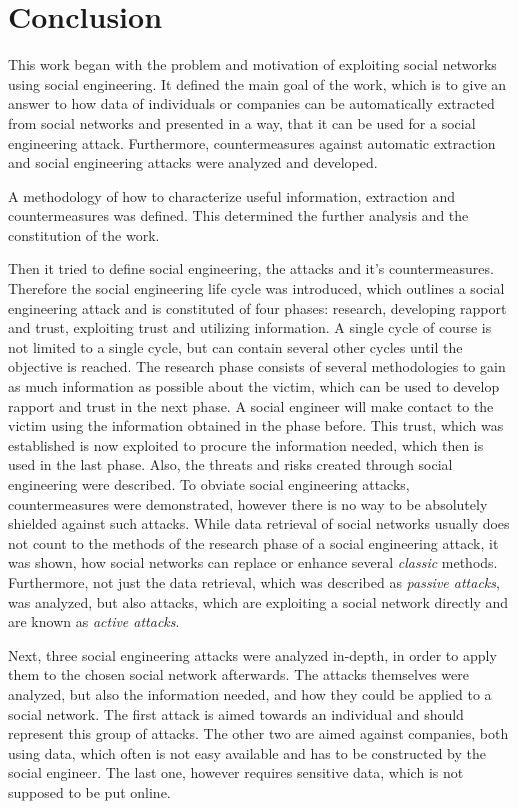 \chapter{Conclusion}
\label{chap:conclusion}

This work began with the problem and motivation of exploiting social networks
using social engineering. It defined the main goal of the work, which is to
give an answer to how data of individuals or companies can be automatically
extracted from social networks and presented in a way, that it can be used for
a social engineering attack. Furthermore, countermeasures against automatic
extraction and social engineering attacks were analyzed and developed.

A methodology of how to characterize useful information, extraction and
countermeasures was defined. This determined the further analysis and the
constitution of the work.

Then it tried to define social engineering, the attacks and it's countermeasures.
Therefore the social engineering life cycle was introduced, which outlines a
social engineering attack and is constituted of four phases: research, developing
rapport and trust, exploiting trust and utilizing information. A single cycle
of course is not limited to a single cycle, but can contain several other
cycles until the objective is reached. The research phase consists of several
methodologies to gain as much information as possible about the victim, which
can be used to develop rapport and trust in the next phase. A social engineer
will make contact to the victim using the information obtained in the phase
before. This trust, which was established is now exploited to procure the
information needed, which then is used in the last phase. Also, the threats
and risks created through social engineering were described. To obviate social
engineering attacks, countermeasures were demonstrated, however there is no way
to be absolutely shielded against such attacks. While data retrieval of social
networks usually does not count to the methods of the research phase of a
social engineering attack, it was shown, how social networks can replace or
enhance several \textit{classic} methods. Furthermore, not just the data
retrieval, which was described as \textit{passive attacks}, was analyzed, but
also attacks, which are exploiting a social network directly and are known as
\textit{active attacks}.

Next, three social engineering attacks were analyzed in-depth, in order to
apply them to the chosen social network afterwards. The attacks themselves were
analyzed, but also the information needed, and how they could be applied to a
social network. The first attack is aimed towards an individual and should
represent this group of attacks. The other two are aimed against companies,
both using data, which often is not easy available and has to be constructed by
the social engineer. The last one, however requires sensitive data, which is
not supposed to be put online.

